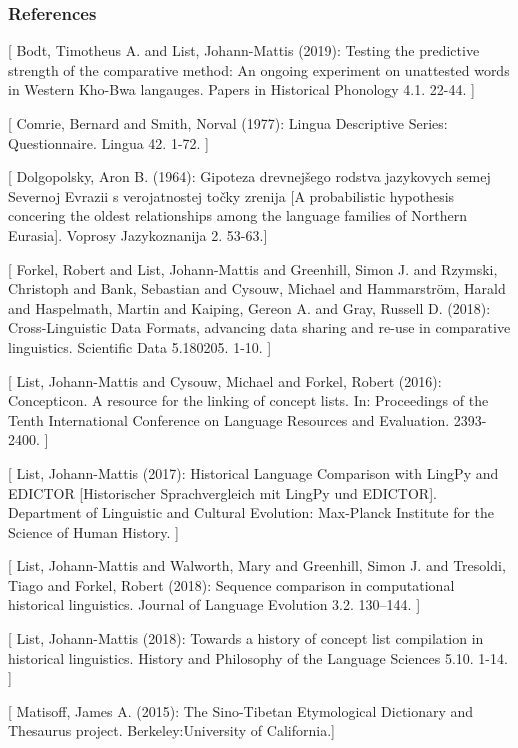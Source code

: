 \documentclass[
  a4paper,
  14pt,
  oneside,
  tablecaptionabove
]{scrbook}
\begin{document}
\hypertarget{references-5}{%
\subsubsection*{References}\label{references-5}}

{[} Bodt, Timotheus A. and List, Johann-Mattis (2019): Testing the
predictive strength of the comparative method: An ongoing experiment on
unattested words in Western Kho-Bwa langauges. Papers in Historical
Phonology 4.1. 22-44. {]}

{[} Comrie, Bernard and Smith, Norval (1977): Lingua Descriptive Series:
Questionnaire. Lingua 42. 1-72. {]}

{[} Dolgopolsky, Aron B. (1964): Gipoteza drevnejšego rodstva jazykovych
semej Severnoj Evrazii s verojatnostej točky zrenija {[}A probabilistic
hypothesis concering the oldest relationships among the language
families of Northern Eurasia{]}. Voprosy Jazykoznanija 2. 53-63.{]}

{[} Forkel, Robert and List, Johann-Mattis and Greenhill, Simon J. and
Rzymski, Christoph and Bank, Sebastian and Cysouw, Michael and
Hammarström, Harald and Haspelmath, Martin and Kaiping, Gereon A. and
Gray, Russell D. (2018): Cross-Linguistic Data Formats, advancing data
sharing and re-use in comparative linguistics. Scientific Data 5.180205.
1-10. {]}

{[} List, Johann-Mattis and Cysouw, Michael and Forkel, Robert (2016):
Concepticon. A resource for the linking of concept lists. In:
Proceedings of the Tenth International Conference on Language Resources
and Evaluation. 2393-2400. {]}

{[} List, Johann-Mattis (2017): Historical Language Comparison with
LingPy and EDICTOR {[}Historischer Sprachvergleich mit LingPy und
EDICTOR{]}. Department of Linguistic and Cultural Evolution: Max-Planck
Institute for the Science of Human History. {]}

{[} List, Johann-Mattis and Walworth, Mary and Greenhill, Simon J. and
Tresoldi, Tiago and Forkel, Robert (2018): Sequence comparison in
computational historical linguistics. Journal of Language Evolution 3.2.
130--144. {]}

{[} List, Johann-Mattis (2018): Towards a history of concept list
compilation in historical linguistics. History and Philosophy of the
Language Sciences 5.10. 1-14. {]}

{[} Matisoff, James A. (2015): The Sino-Tibetan Etymological Dictionary
and Thesaurus project. Berkeley:University of California.{]}
\end{document}
